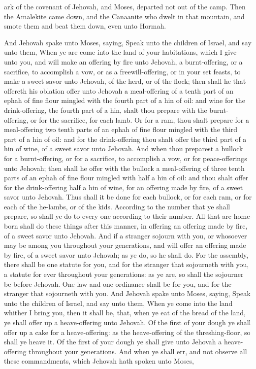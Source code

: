 ark of the covenant of Jehovah, and Moses, departed not out of the camp. Then the Amalekite came down, and the Canaanite who dwelt in that mountain, and smote them and beat them down, even unto Hormah. 

And Jehovah spake unto Moses, saying, Speak unto the children of Israel, and say unto them, When ye are come into the land of your habitations, which I give unto you, and will make an offering by fire unto Jehovah, a burnt-offering, or a sacrifice, to accomplish a vow, or as a freewill-offering, or in your set feasts, to make a sweet savor unto Jehovah, of the herd, or of the flock; then shall he that offereth his oblation offer unto Jehovah a meal-offering of a tenth part of an ephah of fine flour mingled with the fourth part of a hin of oil: and wine for the drink-offering, the fourth part of a hin, shalt thou prepare with the burnt-offering, or for the sacrifice, for each lamb. Or for a ram, thou shalt prepare for a meal-offering two tenth parts of an ephah of fine flour mingled with the third part of a hin of oil: and for the drink-offering thou shalt offer the third part of a hin of wine, of a sweet savor unto Jehovah. And when thou preparest a bullock for a burnt-offering, or for a sacrifice, to accomplish a vow, or for peace-offerings unto Jehovah; then shall he offer with the bullock a meal-offering of three tenth parts of an ephah of fine flour mingled with half a hin of oil: and thou shalt offer for the drink-offering half a hin of wine, for an offering made by fire, of a sweet savor unto Jehovah.  Thus shall it be done for each bullock, or for each ram, or for each of the he-lambs, or of the kids. According to the number that ye shall prepare, so shall ye do to every one according to their number. All that are home-born shall do these things after this manner, in offering an offering made by fire, of a sweet savor unto Jehovah. And if a stranger sojourn with you, or whosoever may be among you throughout your generations, and will offer an offering made by fire, of a sweet savor unto Jehovah; as ye do, so he shall do. For the assembly, there shall be one statute for you, and for the stranger that sojourneth with you, a statute for ever throughout your generations: as ye are, so shall the sojourner be before Jehovah. One law and one ordinance shall be for you, and for the stranger that sojourneth with you.  And Jehovah spake unto Moses, saying, Speak unto the children of Israel, and say unto them, When ye come into the land whither I bring you, then it shall be, that, when ye eat of the bread of the land, ye shall offer up a heave-offering unto Jehovah. Of the first of your dough ye shall offer up a cake for a heave-offering: as the heave-offering of the threshing-floor, so shall ye heave it. Of the first of your dough ye shall give unto Jehovah a heave-offering throughout your generations.  And when ye shall err, and not observe all these commandments, which Jehovah hath spoken unto Moses, 